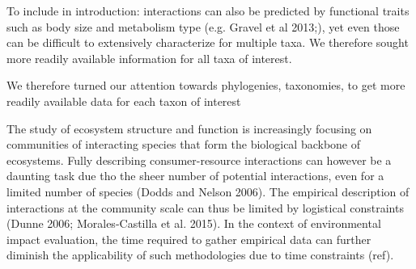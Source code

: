 \documentclass[letterpaper]{article}
\begin{document}




To include in introduction: interactions can also be predicted by functional traits such as body size and metabolism type (e.g. Gravel et al 2013;), yet even those can be difficult to extensively characterize for multiple taxa. We therefore sought more readily available information for all taxa of interest.

We therefore turned our attention towards phylogenies, taxonomies, to get more readily available data for each taxon of interest


The study of ecosystem structure and function is increasingly focusing on communities of interacting species that form the biological backbone of ecosystems. Fully describing consumer-resource interactions can however be a daunting task due tho the sheer number of potential interactions, even for a limited number of species (Dodds and Nelson 2006). The empirical description of interactions at the community scale can thus be limited by logistical constraints (Dunne 2006; Morales-Castilla et al. 2015). In the context of environmental impact evaluation, the time required to gather empirical data can further diminish the applicability of such methodologies due to time constraints (ref).



\end{document}
